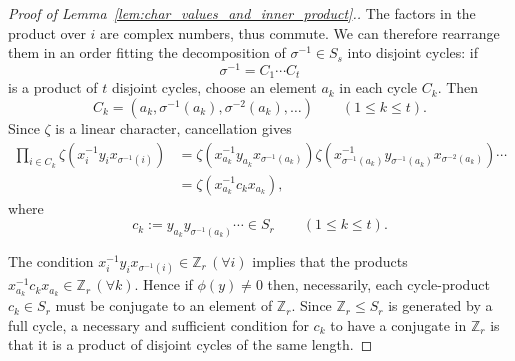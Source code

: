 \documentclass[10pt]{article}
\theoremstyle{definition}
\def\ZZ{{\mathbb Z}}
\begin{document}
\begin{proof}[Proof of  Lemma~\ref{lem:char_values_and_inner_product}.]
    The factors in the product over $i$ are complex numbers, thus commute. We can therefore rearrange them in an order fitting the decomposition of $\sigma^{-1} \in S_s$ into disjoint cycles: if
    \[
        \sigma^{-1} = C_1 \cdots C_t
    \]
    is a product of $t$ disjoint cycles, choose an element $a_k$ in each cycle $C_k$. Then
    \[
        C_k = (a_k, \sigma^{-1}(a_k), \sigma^{-2}(a_k), \ldots)
        \qquad (1 \le k \le t).
    \]
    Since $\zeta$ is a linear character, cancellation gives
    \begin{align*}
        \prod_{i \in C_k} \zeta(x_i^{-1}y_ix_{\sigma^{-1}(i)})
        &= \zeta(x_{a_k}^{-1}y_{a_k}x_{\sigma^{-1}({a_k})})
        \zeta(x_{\sigma^{-1}({a_k})}^{-1}y_{\sigma^{-1}({a_k})}x_{\sigma^{-2}(a_k)})
        \cdots \\
        &= \zeta(x_{a_k}^{-1}c_kx_{a_k}),
    \end{align*}
    where
    \[
        c_k := y_{a_k} y_{\sigma^{-1}({a_k})} \cdots \in S_r
        \qquad (1 \le k \le t).
    \]
		
    The condition $x_i^{-1}y_ix_{\sigma^{-1}(i)} \in \ZZ_r\, (\forall i)$ implies that the products $x_{a_k}^{-1}c_kx_{a_k}\in \ZZ_r\, (\forall k)$. 
    Hence if $\phi(y) \ne 0$ then, necessarily, each cycle-product $c_k \in S_r$ must be conjugate to an element of $\ZZ_r$.
    Since $\ZZ_r \le S_r$ is generated by a full cycle, 
    a necessary and sufficient condition for $c_k$ to have a conjugate in $\ZZ_r$ is that it is a product of disjoint cycles of the same length.


\end{proof}
\end{document}
